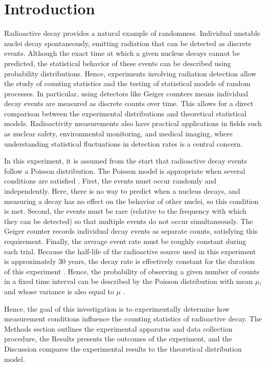 \documentclass[letterpaper,12pt]{article}
\begin{document}
\newpage 

\setcounter{page}{1}

\section{Introduction}
Radioactive decay provides a natural example of randomness. Individual unstable nuclei decay spontaneously, emitting radiation that can be detected as discrete events. Although the exact time at which a given nucleus decays cannot be predicted, the statistical behavior of these events can be described using probability distributions. Hence, experiments involving radiation detection allow the study of counting statistics and the testing of statistical models of random processes. In particular, using detectors like Geiger counters means individual decay events are measured as discrete counts over time. This allows for a direct comparison between the experimental distributions and theoretical statistical models. Radioactivity measurements also have practical applications in fields such as nuclear safety, environmental monitoring, and medical imaging, where understanding statistical fluctuations in detection rates is a central concern.

In this experiment, it is assumed from the start that radioactive decay events follow a Poisson distribution. The Poisson model is appropriate when several conditions are satisfied \cite{LabManual4}. First, the events must occur randomly and independently. Here, there is no way to predict when a nucleus decays, and measuring a decay has no effect on the behavior of other nuclei, so this condition is met. Second, the events must be rare (relative to the frequency with which they can be detected) so that multiple events do not occur simultaneously. The Geiger counter records individual decay events as separate counts, satisfying this requirement. Finally, the average event rate must be roughly constant during each trial. Because the half-life of the radioactive source used in this experiment is approximately 30 years, the decay rate is effectively constant for the duration of this experiment \cite{LabManual4}. Hence, the probability of observing a given number of counts in a fixed time interval can be described by the Poisson distribution with mean $\mu$, and whose variance is also equal to $\mu$ \cite{LabManual4}.

Hence, the goal of this investigation is to experimentally determine how measurement conditions influence the counting statistics of radioactive decay. The Methods section outlines the experimental apparatus and data collection procedure, the Results presents the outcomes of the experiment, and the Discussion compares the experimental results to the theoretical distribution model.
\end{document}
